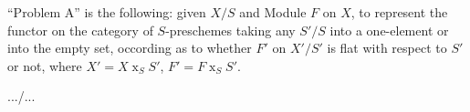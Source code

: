 ``Problem A'' is the following: given $X/S$ and Module $F$ on $X$, to represent the functor on the category of $S$-preschemes taking any $S'/S$ into a one-element or into the empty set, occording as to whether $F'$ on $X'/S'$ is flat with respect to $S'$ or not, where $X'=X\mathbin{x}_{S}S'$, $F'=F\mathbin{x}_{S}S'$.

\hfill .../...\par
